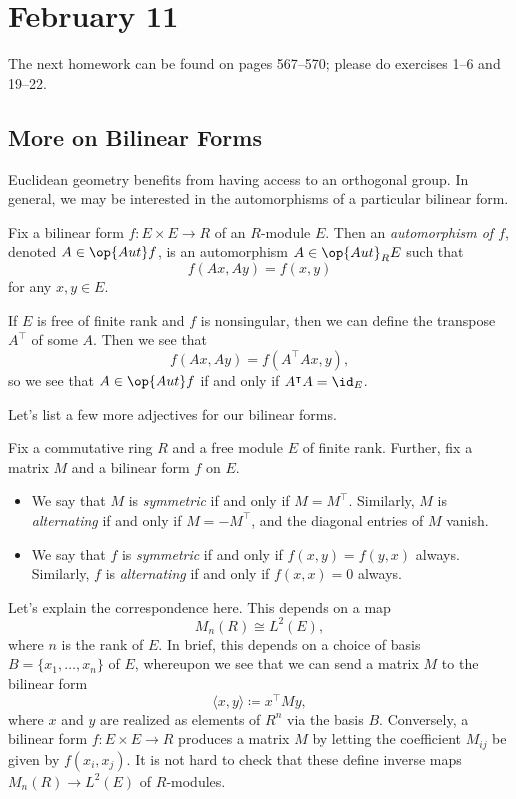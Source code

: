 \documentclass[../notes.tex]{subfiles}
\begin{document}
\section{February 11}

The next homework can be found on pages 567--570; please do exercises 1--6 and 19--22.

\subsection{More on Bilinear Forms}
Euclidean geometry benefits from having access to an orthogonal group. In general, we may be interested in the automorphisms of a particular bilinear form.
\begin{definition}
	Fix a bilinear form $f\colon E\times E\to R$ of an $R$-module $E$. Then an \textit{automorphism of $f$}, denoted $A\in\op{Aut}f$, is an automorphism $A\in\op{Aut}_RE$ such that
	\[f(Ax,Ay)=f(x,y)\]
	for any $x,y\in E$.
\end{definition}
\begin{remark}
	If $E$ is free of finite rank and $f$ is nonsingular, then we can define the transpose $A^\intercal$ of some $A$. Then we see that
	\[f(Ax,Ay)=f(A^\intercal Ax,y),\]
	so we see that $A\in\op{Aut}f$ if and only if $A^\intercal A=\id_E$.
\end{remark}
Let's list a few more adjectives for our bilinear forms.
\begin{definition}
	Fix a commutative ring $R$ and a free module $E$ of finite rank. Further, fix a matrix $M$ and a bilinear form $f$ on $E$.
	\begin{itemize}
		\item We say that $M$ is \textit{symmetric} if and only if $M=M^\intercal$. Similarly, $M$ is \textit{alternating} if and only if $M=-M^\intercal$, and the diagonal entries of $M$ vanish.
		\item We say that $f$ is \textit{symmetric} if and only if $f(x,y)=f(y,x)$ always. Similarly, $f$ is \textit{alternating} if and only if $f(x,x)=0$ always.
	\end{itemize}
\end{definition}
Let's explain the correspondence here. This depends on a map
\[M_n(R)\cong L^2(E),\]
where $n$ is the rank of $E$. In brief, this depends on a choice of basis $B=\{x_1,\ldots,x_n\}$ of $E$, whereupon we see that we can send a matrix $M$ to the bilinear form
\[\langle x,y\rangle\coloneqq x^\intercal My,\]
where $x$ and $y$ are realized as elements of $R^n$ via the basis $B$. Conversely, a bilinear form $f\colon E\times E\to R$ produces a matrix $M$ by letting the coefficient $M_{ij}$ be given by $f(x_i,x_j)$. It is not hard to check that these define inverse maps $M_n(R)\to L^2(E)$ of $R$-modules.
\end{document}
